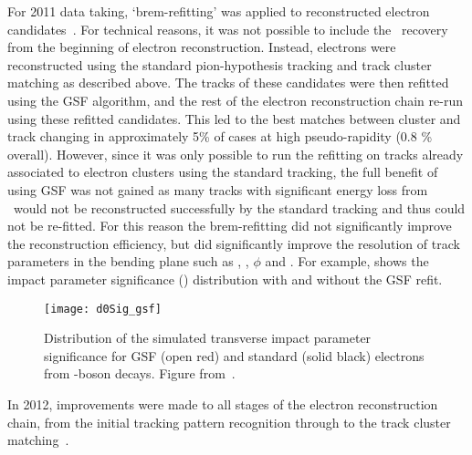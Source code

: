 For 2011 data taking, `brem-refitting' was applied to
reconstructed electron candidates~\cite{ATLAS-CONF-2012-047}. For technical reasons, it was not possible to
include the \brem\ recovery from the beginning of electron reconstruction.
Instead, electrons were reconstructed using the standard pion-hypothesis
tracking and track cluster matching as described above. The tracks of these candidates were then refitted
using the GSF algorithm, 
and the rest of the electron reconstruction
chain re-run using these refitted candidates. This led to the best matches between
cluster and track changing in approximately 5\% of cases at high pseudo-rapidity (0.8 \%
overall). However, since it was only possible to run the refitting on tracks
already associated to electron clusters using the standard tracking, the full
benefit of using GSF was not gained as many tracks with significant energy loss
from \brem\ would not be reconstructed successfully by the standard tracking and
thus could not be re-fitted. For this reason the brem-refitting did not
significantly improve the reconstruction efficiency, but did significantly
improve the resolution of track parameters in the bending plane such as \dzero, \dzerosig,
$\phi$ and \qoverp. For example,  shows the impact parameter
significance (\dzerosig) distribution with and without the GSF refit. 

\begin{figure}[h!]
\centering
            \texttt{[image: d0Sig\_gsf]}
\caption[Distribution of the simulated transverse impact parameter significance for GSF and standard electrons from \Z-boson decays. ]{Distribution of the simulated transverse impact parameter significance for GSF (open
red) and standard (solid black) electrons from \Z-boson decays. 
Figure from~\cite{ATLAS-CONF-2012-047}.}
\label{fig:d0Sig-gsf}
\end{figure}


In 2012, improvements were made to all stages of the electron reconstruction
chain, from the initial tracking pattern recognition through to the track
cluster matching~\cite{HSG2:1456228}. 

